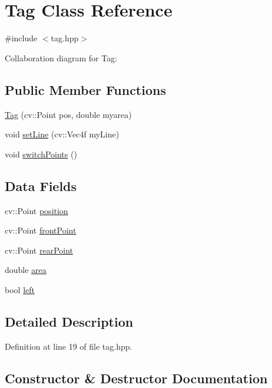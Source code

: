 \hypertarget{class_tag}{}\section{Tag Class Reference}
\label{class_tag}


{\ttfamily \#include $<$tag.\+hpp$>$}



Collaboration diagram for Tag\+:
\subsection*{Public Member Functions}
\begin{DoxyCompactItemize}
\item 
\hyperlink{class_tag_ac26007eb4ef2fbadbc58a47731369a24}{Tag} (cv\+::\+Point pos, double myarea)
\item 
void \hyperlink{class_tag_a879d13a2559bfc88c965a403ca7f6428}{set\+Line} (cv\+::\+Vec4f my\+Line)
\item 
void \hyperlink{class_tag_a4db5be8412c2712715aa253ec4cbda96}{switch\+Points} ()
\end{DoxyCompactItemize}
\subsection*{Data Fields}
\begin{DoxyCompactItemize}
\item 
cv\+::\+Point \hyperlink{class_tag_a254916f52244a8ff7d559eff681450a1}{position}
\item 
cv\+::\+Point \hyperlink{class_tag_a7c2bc76740b514cbc77487468535c670}{front\+Point}
\item 
cv\+::\+Point \hyperlink{class_tag_adfb71b0abef8e25842afa292397b8140}{rear\+Point}
\item 
double \hyperlink{class_tag_a0e977e5b9c03ed1280eb9aeedd3c9dbc}{area}
\item 
bool \hyperlink{class_tag_a867bd4f49f47b0650834af1eb22671d9}{left}
\end{DoxyCompactItemize}


\subsection{Detailed Description}


Definition at line 19 of file tag.\+hpp.



\subsection{Constructor \& Destructor Documentation}
\mbox{\label{class_tag_ac26007eb4ef2fbadbc58a47731369a24}} 
